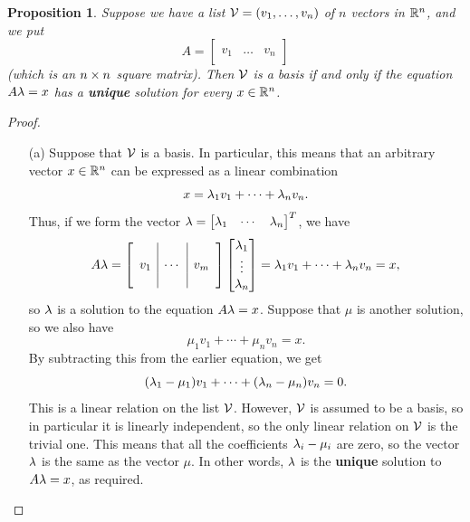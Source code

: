 \documentclass[reqno]{amsart}
\newtheorem{proposition}[theorem]{Proposition}
\theoremstyle{definition}
\begin{document}
\begin{proposition}\label{prop-basis}
 Suppose we have a list $\mathcal{V}=(v_1,\dotsc,v_n)$ of $n$ vectors in
 ${\mathbb{R}}^n$, and we put
 \[ A = \left[\begin{array}{c|c|c}
              && \\
              v_1 & \dotsc & v_n \\
              &&
            \end{array}\right]
 \]
 (which is an $n\times n$ square matrix).  Then $\mathcal{V}$ is a basis if and
 only if the equation $A\lambda=x$ has a \textbf{unique} solution for
 every $x\in{\mathbb{R}}^n$.
\end{proposition}
\begin{proof}
 \begin{itemize}
  \item[(a)]
   Suppose that $\mathcal{V}$ is a basis.  In particular, this means that an
   arbitrary vector $x\in{\mathbb{R}}^n$ can be expressed as a linear combination
   \[ x = \lambda_1v_1 + \dotsb + \lambda_nv_n. \]
   Thus, if we form the vector $\lambda=\left[\begin{matrix} \lambda_1 & \dotsb & \lambda_n\end{matrix}\right]^T$,
   we have
   \[ A\lambda = \left[\begin{array}{c|c|c}
              && \\ v_1 & \cdots & v_m \\ &&
             \end{array}\right]
             \left[\begin{matrix} \lambda_1 \\ \vdots \\ \lambda_n \end{matrix}\right]
       = \lambda_1v_1 + \dotsb + \lambda_nv_n = x,
   \]
   so $\lambda$ is a solution to the equation $A\lambda=x$.  Suppose that $\mu$
   is another solution, so we also have
   \[ \mu_1v_1 + \dotsb + \mu_nv_n = x. \]
   By subtracting this from the earlier equation, we get
   \[ (\lambda_1-\mu_1)v_1 + \dotsb + (\lambda_n-\mu_n)v_n = 0. \]
   This is a linear relation on the list $\mathcal{V}$.  However, $\mathcal{V}$ is
   assumed to be a basis, so in particular it is linearly independent,
   so the only linear relation on $\mathcal{V}$ is the trivial one.  This means
   that all the coefficients $\lambda_i-\mu_i$ are zero, so the vector $\lambda$
   is the same as the vector $\mu$.  In other words, $\lambda$ is the
   \textbf{unique} solution to $A\lambda=x$, as required.


\end{itemize}
\end{proof}
\end{document}
